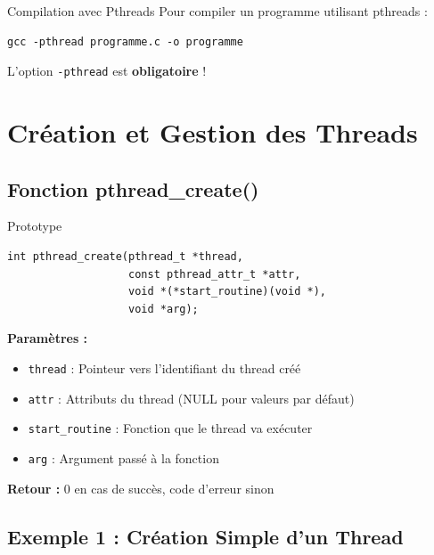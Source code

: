 \documentclass[11pt,a4paper]{article}
\begin{document}
\begin{importantbox}{Compilation avec Pthreads}
Pour compiler un programme utilisant pthreads :
\begin{verbatim}
gcc -pthread programme.c -o programme
\end{verbatim}
L'option \texttt{-pthread} est \textbf{obligatoire} !
\end{importantbox}

\section{Création et Gestion des Threads}

\subsection{Fonction pthread\_create()}

\begin{definitionbox}{Prototype}
\begin{verbatim}
int pthread_create(pthread_t *thread, 
                   const pthread_attr_t *attr,
                   void *(*start_routine)(void *), 
                   void *arg);
\end{verbatim}
\end{definitionbox}

\textbf{Paramètres :}
\begin{itemize}
    \item \texttt{thread} : Pointeur vers l'identifiant du thread créé
    \item \texttt{attr} : Attributs du thread (NULL pour valeurs par défaut)
    \item \texttt{start\_routine} : Fonction que le thread va exécuter
    \item \texttt{arg} : Argument passé à la fonction
\end{itemize}

\textbf{Retour :} 0 en cas de succès, code d'erreur sinon

\subsection{Exemple 1 : Création Simple d'un Thread}
\end{document}
